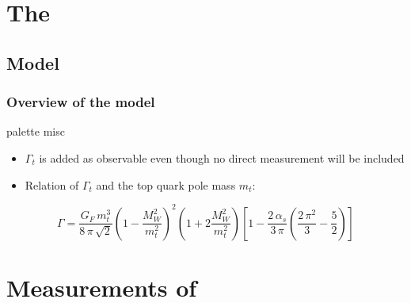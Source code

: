 \documentclass{beamer}
\begin{document}
\section{The}
\subsection{Model}
\begin{frame}
\vspace{-1.3cm}
	\frametitle{Overview of the model}
	\begin{table}
		\resizebox{!}{0.11\textwidth}{
		}
	\end{table}
	\begin{beamercolorbox}[rounded=true,shadow=true]{palette misc}
	\begin{itemize}
		\item $\Gamma_t$ is added as observable even though no direct measurement will be included 
		\item Relation of $\Gamma_t$ and the top quark pole mass $m_t$:
	\end{itemize}
	\begin{equation*}
		\Gamma = \frac{G_F \, m_t^3}{8 \, \pi \, \sqrt{2}} \left(1 - \frac{M_W^2}{m_t^2} \right)^2 \left(1 + 2 \frac{M_W^2}{m_t^2} \right) \left[1 - \frac{2 \, \alpha_s}{3 \, \pi} \left( \frac{2 \, \pi^2}{3} - \frac{5}{2} \right) \right]
		\label{eqn:gamma}
	\end{equation*}
	\end{beamercolorbox}
\end{frame}

\section{Measurements of}
\end{document}
